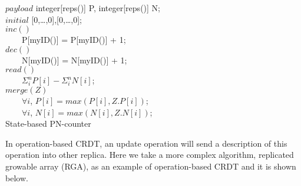\renewcommand{\algorithmcfname}{CRDT}
\noindent
\noindent\begin{algorithm}[H]
$\mathit{payload}$ integer[reps()] P, integer[reps()] N; \\
$\mathit{initial}$ [0,\ldots,0],[0,\ldots,0]; \\

$inc()$ \\
\ \ \ \ P[myID()] = P[myID()] + 1; \\

$dec()$ \\
\ \ \ \ N[myID()] = N[myID()] + 1; \\

$read()$ \\
\ \ \ \ \KwRet $\Sigma_{i}^{n} P[i] - \Sigma_{i}^{n} N[i]$; \\

$merge(Z)$ \\
\ \ \ \ $\forall i$, $P[i] = \mathit{max}(P[i],Z.P[i])$; \\
\ \ \ \ $\forall i$, $N[i] = \mathit{max}(N[i],Z.N[i])$; \\
\caption{State-based PN-counter}
\label{Method1}
\end{algorithm}

In operation-based CRDT, an update operation will send a description of this operation into other replica. Here we take a more complex algorithm, replicated growable array (RGA), as an example of operation-based CRDT and it is shown below.

